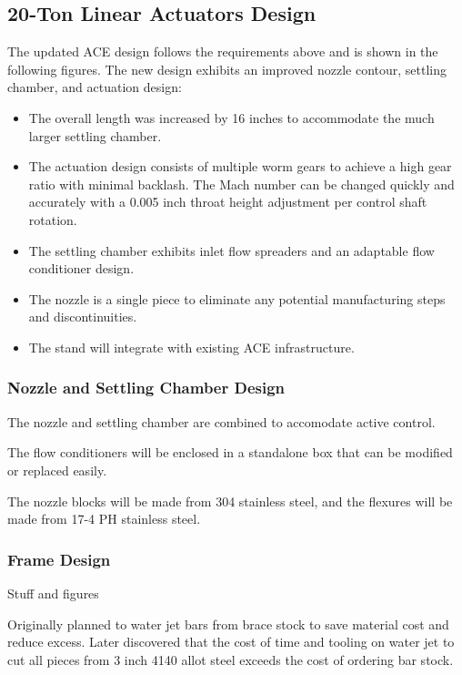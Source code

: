 \subsection{20-Ton Linear Actuators Design}

The updated ACE design follows the requirements above and is shown in the following figures. The new design exhibits an improved nozzle contour, settling chamber, and actuation design:
\begin{itemize}
    \item The overall length was increased by 16 inches to accommodate the much larger settling chamber.
    \item The actuation design consists of multiple worm gears to achieve a high gear ratio with minimal backlash. The Mach number can be changed quickly and accurately with a 0.005 inch throat height adjustment per control shaft rotation.
    \item The settling chamber exhibits inlet flow spreaders and an adaptable flow conditioner design.
    \item The nozzle is a single piece to eliminate any potential manufacturing steps and discontinuities.
    \item The stand will integrate with existing ACE infrastructure.
\end{itemize}

\subsubsection{Nozzle and Settling Chamber Design}

The nozzle and settling chamber are combined to accomodate active control.

The flow conditioners will be enclosed in a standalone box that can be modified or replaced easily.

The nozzle blocks will be made from 304 stainless steel, and the flexures will be made from 17-4 PH stainless steel.

\subsubsection{Frame Design}

Stuff and figures

Originally planned to water jet bars from brace stock to save material cost and reduce excess. Later discovered that the cost of time and tooling on water jet to cut all pieces from 3 inch 4140 allot steel exceeds the cost of ordering bar stock.

